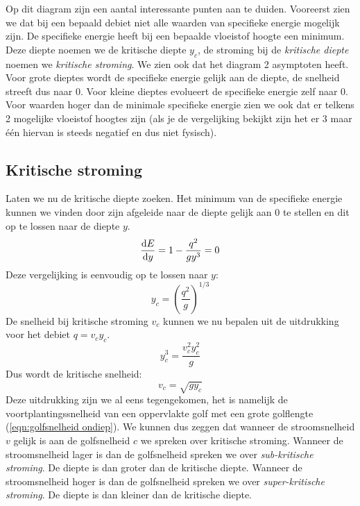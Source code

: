 Op dit diagram zijn een aantal interessante punten aan te duiden. Vooreerst zien we dat bij een bepaald debiet niet alle waarden van specifieke energie mogelijk zijn. De specifieke energie heeft bij een bepaalde vloeistof hoogte een minimum. Deze diepte noemen we de kritische diepte $y_c$, de stroming bij de \emph{kritische diepte} noemen we \emph{kritische stroming}. We zien ook dat het diagram 2 asymptoten heeft. Voor grote dieptes wordt de specifieke energie gelijk aan de diepte, de snelheid streeft dus naar 0. Voor kleine dieptes evolueert de specifieke energie zelf naar 0. Voor waarden hoger dan de minimale specifieke energie zien we ook dat er telkens 2 mogelijke vloeistof hoogtes zijn (als je de vergelijking bekijkt zijn het er 3 maar één hiervan is steeds negatief en dus niet fysisch).

		\subsection{Kritische stroming}
Laten we nu de kritische diepte zoeken. Het minimum van de specifieke energie kunnen we vinden door zijn afgeleide naar de diepte gelijk aan 0 te stellen en dit op te lossen naar de diepte $y$.
\begin{equation}
	\frac{\mathrm{d} E}{\mathrm{d} y} = 1 - \frac{q^2}{g y^3} = 0
\end{equation}
Deze vergelijking is eenvoudig op te lossen naar $y$:
\begin{equation}
	y_c = \left( \frac{q^2}{g} \right)^{1/3}
\end{equation}
De snelheid bij kritische stroming $v_c$ kunnen we nu bepalen uit de uitdrukking voor het debiet $q = v_c y_c$. 
\begin{equation}
	y_c^3 = \frac{v_c^2 y_c^2}{g}
\end{equation}
Dus wordt de kritische snelheid:
\begin{equation}
	v_c = \sqrt{g y_c}
\end{equation}
Deze uitdrukking zijn we al eens tegengekomen, het is namelijk de voortplantingssnelheid van een oppervlakte golf met een grote golflengte (\ref{eqn:golfsnelheid ondiep}). We kunnen dus zeggen dat wanneer de stroomsnelheid  $v$ gelijk is aan de golfsnelheid $c$ we spreken over kritische stroming. Wanneer de stroomsnelheid lager is dan de golfsnelheid spreken we over \emph{sub-kritische stroming}. De diepte is dan groter dan de kritische diepte.  Wanneer de stroomsnelheid hoger is dan de golfsnelheid spreken we over \emph{super-kritische stroming}.  De diepte is dan kleiner dan de kritische diepte.

